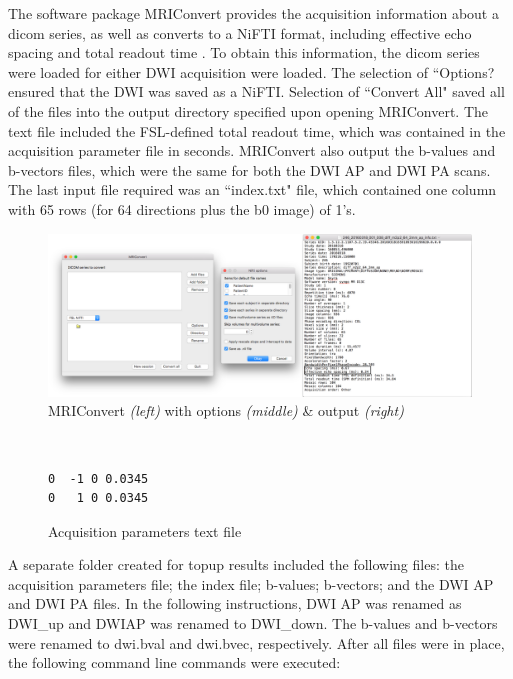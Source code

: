 The software package MRIConvert provides the acquisition information about a dicom series, as well as converts to a NiFTI format, including effective echo spacing and total readout time \cite{ref:mriconvert}. To obtain this information, the dicom series were loaded for either DWI acquisition were loaded. The selection of ``Options? ensured that the DWI was saved as a NiFTI. Selection of ``Convert All" saved all of the files into the output directory specified upon opening MRIConvert. The text file included the FSL-defined total readout time, which was contained in the acquisition parameter file in seconds. MRIConvert also output the b-values and b-vectors files, which were the same for both the DWI AP and DWI PA scans. The last input file required was an ``index.txt" file, which contained one column with 65 rows (for 64 directions plus the b0 image) of 1's.

\begin{figure}[H]
    \centering
    \includegraphics[width=\textwidth]{Figures/combined}
    \caption{MRIConvert \textit{(left)} with options \textit{(middle)} \& output \textit{(right)} }
    \label{fig:mri_convert}
\end{figure}

\begin{figure}[H]
\centering
{\tt
\begin{varwidth}{\linewidth}
\begin{verbatim}
0  -1 0 0.0345
0   1 0 0.0345
\end{verbatim}
\end{varwidth}
}
\label{fig:acq}
\caption{Acquisition parameters text file}
\end{figure}

A separate folder created for topup results included the following files: the acquisition parameters file; the index file; b-values; b-vectors; and the DWI AP and DWI PA files. In the following instructions, DWI AP was renamed as DWI\_up and DWIAP was renamed to DWI\_down. The b-values and b-vectors were renamed to dwi.bval and dwi.bvec, respectively. After all files were in place, the following command line commands were executed:

